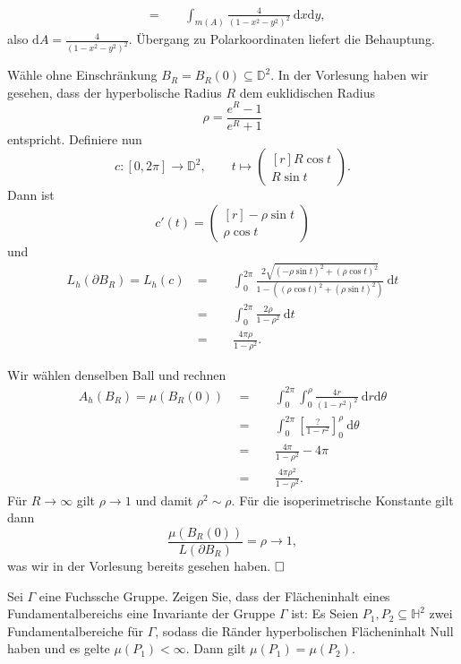\documentclass[11pt]{book}
\numberwithin{dummy}{section}
\theoremstyle{nonumberbreak}
\newenvironment{prob}[1][]{\ifthenelse{\equal{#1}{}}{\problem}{\problem[#1]}\rm}{\endproblem}
\newenvironment{sol}[1][]{\ifthenelse{\equal{#1}{}}{\solution}{\solution[#1]}\rm}{\endsolution}
\newcommand{\He}{\mathbb{H}}
\newcommand{\D}{\mathbb{D}}
\newcommand{\la}{\longrightarrow}
\begin{document}
\begin{spacing}{1.4}
\begin{prob}
\begin{sol}
\begin{compactenum}
\begin{alignat*}{5}
&=&& \ \ \int_{m(A)} \frac{4}{(1-x^2-y^2)^2} \ \mathrm{d}x \mathrm{d}y,
\end{alignat*}
also $\mathrm{d}A= \frac{4}{(1-x^2-y^2)^2}$. Übergang zu Polarkoordinaten liefert die Behauptung. 
\item Wähle ohne Einschränkung $B_R= B_R(0) \subseteq \D^2$. In der Vorlesung haben wir gesehen, dass der hyperbolische Radius $R$ dem euklidischen Radius 
$$\rho = \frac{e^R-1}{e^R+1}$$
entspricht. Definiere nun
$$c:[0,2\pi] \la \D^2, \qquad t \mapsto \begin{pmatrix}[r] R \cos t \\ R \sin t\end{pmatrix}.$$
Dann ist 
$$c'(t)= \begin{pmatrix}[r] - \rho \sin t \\ \rho \cos t \end{pmatrix}$$
und 
\begin{alignat*}{5}
L_h(\partial B_R) = L_h(c) \ &=&& \ \ \int_0^{2\pi} \frac{2 \sqrt{(-\rho \sin t)^2 + (\rho \cos t)^2}}{1- \left( (\rho \cos t)^2 + (\rho \sin t)^2\right)} \ \mathrm{d}t \\
&=&& \ \ \int_0^{2\pi} \frac{2\rho}{1-\rho^2} \ \mathrm{d}t \\
&=&& \ \ \frac{4\pi \rho}{1-\rho^2}.
\end{alignat*}
\item Wir wählen denselben Ball und rechnen 
\begin{alignat*}{5}
A_h(B_R)=\mu(B_R(0)) \ \ &=&& \ \ \int_0^{2\pi} \int_0^{\rho} \frac{4r}{(1-r^2)^2} \ \mathrm{d}r \mathrm{d}\theta \\
&=&& \ \ \int_0^{2\pi} \left[ \frac{?}{1-r^2} \right]^{\rho}_{0} \ \mathrm{d}\theta \\
&=&& \ \ \frac{4\pi}{1-\rho^2} - 4 \pi \\
&=&& \ \ \frac{4\pi \rho^2}{1-\rho^2}.
\end{alignat*}
Für $R \la \infty$ gilt $\rho\la 1$ und damit $\rho^2 \sim \rho$. Für die isoperimetrische Konstante gilt dann
$$\frac{\mu(B_R(0))}{L(\partial B_R)} = \rho \la 1,$$
was wir in der Vorlesung bereits gesehen haben. $\hfill \Box$
\end{compactenum}

\end{sol}

\end{prob}





\begin{prob}    %
Sei $\Gamma$ eine Fuchssche Gruppe. Zeigen Sie, dass der Flächeninhalt eines Fundamentalbereichs eine Invariante der Gruppe $\Gamma$ ist: Es Seien $P_1, P_2 \subseteq \He^2$ zwei Fundamentalbereiche für $\Gamma$, sodass die Ränder hyperbolischen Flächeninhalt Null haben und es gelte $\mu(P_1)<\infty$. Dann gilt $\mu(P_1) = \mu(P_2)$.


\end{prob}
\end{spacing}
\end{document}
